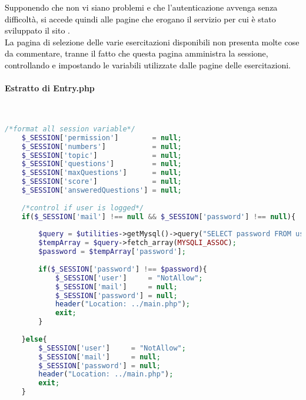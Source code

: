 \textcolor{black}{Supponendo che non vi siano problemi e che l'autenticazione avvenga senza difficoltà, si accede quindi alle pagine che erogano il servizio per cui è stato sviluppato il sito .\\
La pagina di selezione delle varie esercitazioni disponibili non presenta molte cose da commentare, tranne il fatto che questa pagina amministra la sessione, controllando e impostando le variabili utilizzate dalle pagine delle esercitazioni.}

\paragraph{Estratto di Entry.php}\leavevmode\\

\begin{lstlisting}[language=php]
	/*format all session variable*/
	$_SESSION['permission']        = null;
	$_SESSION['numbers']           = null;
	$_SESSION['topic']             = null;
	$_SESSION['questions']         = null;
	$_SESSION['maxQuestions']      = null;
	$_SESSION['score']             = null;
	$_SESSION['answeredQuestions'] = null;
	
	/*control if user is logged*/
	if($_SESSION['mail'] !== null && $_SESSION['password'] !== null){
		
		$query = $utilities->getMysql()->query("SELECT password FROM user_table1 WHERE (email = '{$_SESSION['mail']}')");
		$tempArray = $query->fetch_array(MYSQLI_ASSOC);
		$password = $tempArray['password'];
		
		if($_SESSION['password'] !== $password){
			$_SESSION['user']     = "NotAllow";
			$_SESSION['mail']     = null;
			$_SESSION['password'] = null;
			header("Location: ../main.php");
			exit;
		}
		
	}else{
		$_SESSION['user']     = "NotAllow";
		$_SESSION['mail']     = null;
		$_SESSION['password'] = null;
		header("Location: ../main.php");
		exit;
	}
\end{lstlisting}

